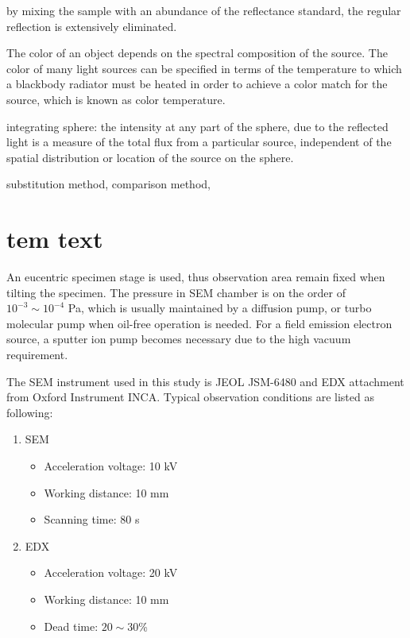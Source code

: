 by mixing the sample with an abundance of the reflectance standard, the regular reflection is extensively eliminated. 

The color of an object depends on the spectral composition of the source. The color of many light sources can be specified in terms of the temperature to which a blackbody radiator must be heated in order to achieve a color match for the source, which is known as color temperature. 

integrating sphere: the intensity at any part of the sphere, due to the reflected light is a measure of the total flux from a particular source, independent of the spatial distribution or location of the source on the sphere. 

substitution method, comparison method, 

\fi
\section{tem text}


\iffalse
An eucentric specimen stage is used, thus observation area remain fixed when tilting the specimen. The pressure in SEM chamber is on the order of $10^{-3} \sim 10^{-4}$ Pa, which is usually maintained by a diffusion pump, or turbo molecular pump when oil-free operation is needed. For a field emission electron source, a sputter ion pump becomes necessary due to the high vacuum requirement. 

The SEM instrument used in this study is JEOL JSM-6480 and EDX attachment from Oxford Instrument INCA. Typical observation conditions are listed as following:

\begin{enumerate}
\item SEM
\begin{itemize}

\item Acceleration voltage: 10 kV
\item Working distance: 10 mm
\item Scanning time: 80 s
\end{itemize}
\item EDX
\begin{itemize}

\item Acceleration voltage: 20 kV
\item Working distance: 10 mm
\item Dead time: $20\sim30$\%
\end{itemize}
\end{enumerate}


